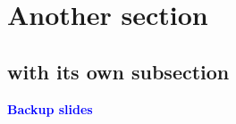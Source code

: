 \documentclass[xcolor=dvipsnames,professionalfonts, aspectratio=169]{beamer}
\begin{document}
\section{Another section}
\subsection{with its own subsection}
\begin{frame}

\end{frame}

\begin{frame}

\end{frame}

\appendix

\begin{frame}[standout]
  \begin{center}
    \Large \bf
    \textcolor{Blue}{Backup slides}
  \end{center}
\end{frame}
\end{document}

